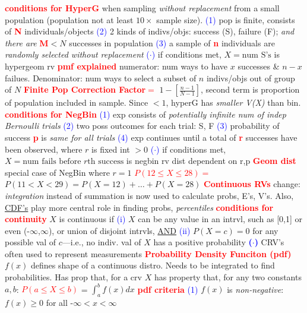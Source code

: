 \documentclass[10pt]{extarticle}
\newcommand{\re}[1]{\textcolor{red}{\textbf{#1}}}
\newcommand{\bt}[1]{\textcolor{blue}{#1}}
\begin{document}
	\re{conditions for HyperG} when sampling \emph{without replacement} from a small population
	(population not at least $10\times$ sample size).
	\bt{(1)} pop is finite, consists of \re{N} individuals/objects
	\bt{(2)} 2 kinds of indivs/objs: success (S), failure (F); \emph{and there are} \re{M}$<N$
	successes in population
	\bt{(3)} a sample of \re{n} individuals are \emph{randomly selected without replacement}
	\bt{(\textbf{$\cdot$})} if conditions met, $X={\text{num S's}}$ is hypergeom rv
	\re{pmf explained} numerator: num ways to have $x$ successes \& $n-x$ failues.
	Denominator: num ways to select a subset of $n$ indivs/objs out of group of $N$
	\re{Finite Pop Correction Factor$=$} $1-[\frac{n-1}{N-1}]$, second term is proportion of population
	included in sample.
	Since $<1$, hyperG has \emph{smaller V(X)} than bin.
	\re{conditions for NegBin}
	\bt{(1)} exp consists of \emph{potentially infinite num of indep Bernoulli trials}
	\bt{(2)} two poss outcomes for each trial: S, F
	\bt{(3)} probability of success \re{p} is \emph{same for all trials}
	\bt{(4)} exp continues until a total of \re{r} successes have been observed, where $r$ is fixed
	int $>0$
	\bt{(\textbf{$\cdot$})} if conditions met, $X={\text{num fails before $r$th success}}$ is
	negbin rv dist dependent on r,p
	\re{Geom dist} special case of NegBin where $r=1$
	\re{$P(12\leq X\leq 28) =$} $P(11<X<29)=P(X=12)+\ldots+P(X=28)$
	\re{Continuous RVs} change: \emph{integration} instead of summation is now used to calculate
	probs, E's, V's. Also, \underline{CDF's} play more central role in finding probs,
	\emph{percentiles}
	\re{conditions for continuity} $X$ is continuous if
	\bt{(i)} $X$ can be any value in an intrvl,
	such as [0,1] or even (-$\infty$,$\infty$), or union of disjoint intrvls, \underline{AND}
	\bt{(ii)} $P(X=c)=0$ for any possible val of $c$---i.e., no indiv. val of $X$ has a positive
	probability
	\bt{\textbf{($\cdot$)}} CRV's often used to represent measurements
	\re{Probability Density Funciton (pdf)} $f(x)$ defines shape of a continuous distro. Needs to
	be integrated to find probabilities. Has prop that, for a crv $X$ has property that, for any two
	constants $a,b$:
	\re{$P(a\leq X\leq b)$} = $\int_{a}^{b}f(x)dx$
	\re{pdf criteria}
	\bt{(1)} $f(x)$ is \emph{non-negative}: $f(x)\geq 0$ for all -$\infty<x<\infty$
\end{document}
